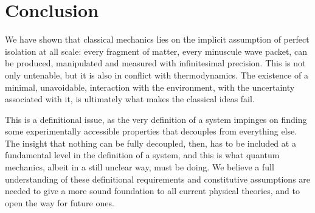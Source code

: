 \documentclass[10pt,twocolumn, nofootinbib]{revtex4-2}
\begin{document}
\section{Conclusion}

We have shown that classical mechanics lies on the implicit assumption of perfect isolation at all scale: every fragment of matter, every minuscule wave packet, can be produced, manipulated and measured with infinitesimal precision. This is not only untenable, but it is also in conflict with thermodynamics. The existence of a minimal, unavoidable, interaction with the environment, with the uncertainty associated with it, is ultimately what makes the classical ideas fail.

This is a definitional issue, as the very definition of a system impinges on finding some experimentally accessible properties that decouples from everything else. The insight that nothing can be fully decoupled, then, has to be included at a fundamental level in the definition of a system, and this is what quantum mechanics, albeit in a still unclear way, must be doing. We believe a full understanding of these definitional requirements and constitutive assumptions are needed to give a more sound foundation to all current physical theories, and to open the way for future ones.




\end{document}

